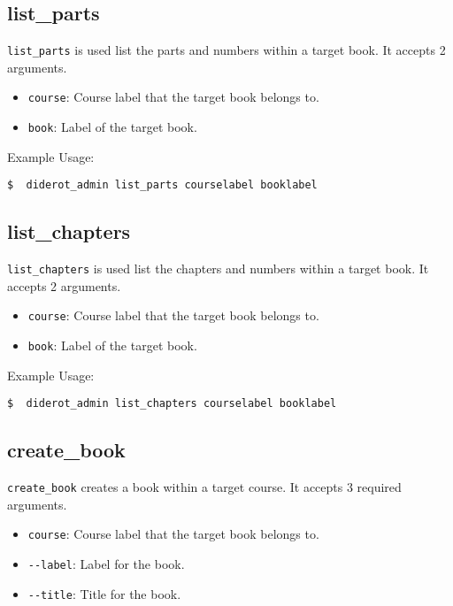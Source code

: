 \subsection{list\_parts}

\verb|list_parts| is used list the parts and numbers within a target book.
It accepts 2 arguments.

\begin{itemize}
  \item \verb|course|: Course label that the target book belongs to.
  \item \verb|book|: Label of the target book.
\end{itemize}

Example Usage:
\begin{verbatim}
$  diderot_admin list_parts courselabel booklabel
\end{verbatim}

\subsection{list\_chapters}

\verb|list_chapters| is used list the chapters and numbers within a target book.
It accepts 2 arguments.

\begin{itemize}
  \item \verb|course|: Course label that the target book belongs to.
  \item \verb|book|: Label of the target book.
\end{itemize}

Example Usage:
\begin{verbatim}
$  diderot_admin list_chapters courselabel booklabel
\end{verbatim}


\subsection{create\_book}

\verb|create_book| creates a book within a target course. It accepts 3 required arguments.

\begin{itemize}
  \item \verb|course|: Course label that the target book belongs to.
  \item \verb|--label|: Label for the book.
  \item \verb|--title|: Title for the book.
\end{itemize}

